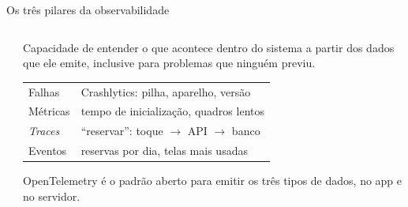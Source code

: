 \documentclass[aspectratio=169,10pt]{beamer}
\begin{document}
\begin{frame}{Os três pilares da observabilidade}
  \begin{columns}[c]
    \begin{column}{0.46\textwidth}
      \centering
    \end{column}
    \begin{column}{0.52\textwidth}
      \begin{definicao}[Observabilidade]
        Capacidade de entender o que acontece dentro do sistema a partir dos dados que ele emite, inclusive para problemas que ninguém previu.
      \end{definicao}
      \scriptsize
      \begin{tabularx}{\linewidth}{@{}l L@{}}
        \toprule
         &  \\
        \midrule
        Falhas & Crashlytics: pilha, aparelho, versão \\
        Métricas & tempo de inicialização, quadros lentos \\
        \emph{Traces} & ``reservar'': toque $\rightarrow$ API $\rightarrow$ banco \\
        Eventos & reservas por dia, telas mais usadas \\
        \bottomrule
      \end{tabularx}
      \begin{dica}
        OpenTelemetry é o padrão aberto para emitir os três tipos de dados, no app e no servidor.
      \end{dica}
    \end{column}
  \end{columns}
\end{frame}
\end{document}

